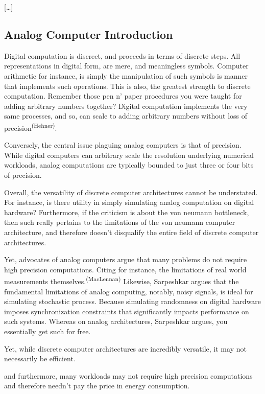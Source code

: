 [\dots]


\subsection*{Analog Computer Introduction}

Digital computation is discreet, and proceeds in terms of discrete steps. All representations in digital form, are mere, and meaningless symbols. Computer arithmetic for instance, is simply the manipulation of such symbols is manner that implements such operations. This is also, the greatest strength to discrete computation. Remember those pen n' paper procedures you were taught for adding arbitrary numbers together? Digital computation implements the very same processes, and so, can scale to adding arbitrary numbers without loss of precision\textsuperscript{(Hehner)}.

Conversely, the central issue plaguing analog computers is that of precision. While digital computers can arbitrary scale the resolution underlying numerical workloads, analog computations are typically bounded to just three or four bits of precision. 

Overall, the versatility of discrete computer architectures cannot be understated. For instance, is there utility in simply simulating analog computation on digital hardware? Furthermore, if the criticism is about the von neumann bottleneck, then such really pertains to the limitations of the von neumann computer architecture, and therefore doesn't disqualify the entire field of discrete computer architectures.

Yet, advocates of analog computers argue that many problems do not require high precision computations. Citing for instance, the limitations of real world measurements themselves.\textsuperscript{(MacLennan)} Likewise, Sarpeshkar argues that the fundamental limitations of analog computing, notably, noisy signals, is ideal for simulating stochastic process. Because simulating randomness on digital hardware imposes synchronization constraints that significantly impacts performance on such systems. Whereas on analog architectures, Sarpeshkar argues, you essentially get such for free.


Yet, while discrete computer architectures are incredibly versatile, it may not necessarily be efficient.  

and furthermore, many workloads may not require high precision computations and therefore needn't pay the price in energy consumption. 

